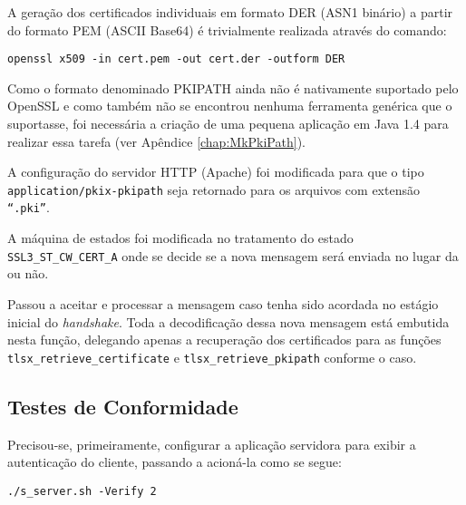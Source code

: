 A geração dos certificados individuais em formato \acs{DER} (\acs{ASN1} binário) a partir 
do formato \acs{PEM} (ASCII Base64) é trivialmente realizada através do comando:

\begin{lstlisting}[caption={Conversão de certificados para o formato \acs{DER}}]
openssl x509 -in cert.pem -out cert.der -outform DER
\end{lstlisting}

Como o formato denominado PKIPATH ainda não é nativamente suportado 
pelo OpenSSL e como também não se encontrou nenhuma ferramenta genérica 
que o suportasse, foi necessária a criação de uma pequena aplicação em Java 1.4 
para realizar essa tarefa (ver Apêndice \vref{chap:MkPkiPath}).

A configuração do servidor \acs{HTTP} (Apache) foi modificada para que o tipo 
\verb|application/pkix-pkipath| seja retornado para os arquivos com extensão  
\texttt{``.pki''}.

\begin{description}[\breaklabel\setlabelstyle{\ttfamily}]

\item[s3\_clnt.c::ssl3\_connect]
	A máquina de estados foi modificada no tratamento do estado 
	\verb|SSL3_ST_CW_CERT_A| onde se decide se a nova mensagem \tlsHsCu 
	será enviada no lugar da \tlsHsC ou não.

\item[s3\_srvr.c::ssl3\_get\_client\_certificate]
	Passou a aceitar e processar a mensagem \tlsHsCu caso tenha sido 
	acordada no estágio inicial do \emph{handshake}. Toda a decodificação dessa nova 
	mensagem está embutida nesta função, delegando apenas a recuperação 
	dos certificados para as funções \verb|tlsx_retrieve_certificate| e 
	\verb|tlsx_retrieve_pkipath| conforme o caso.

\end{description}

\subsection{Testes de Conformidade}

Precisou-se, primeiramente, configurar a aplicação servidora para exibir a 
autenticação do cliente, passando a acioná-la como se segue:

\begin{lstlisting}[caption={Chamada da \texttt{s\_server.sh} para forçar a autenticação do cliente}]
./s_server.sh -Verify 2
\end{lstlisting}


